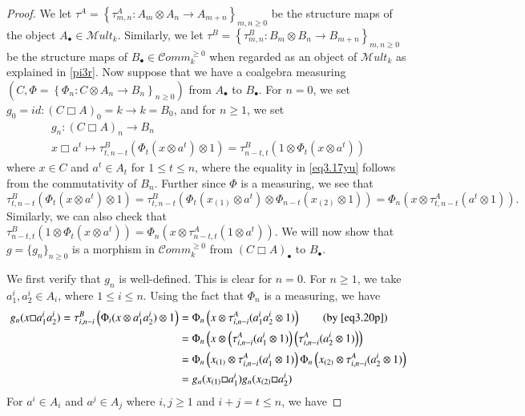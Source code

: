 \documentclass[10pt, colorlinks]{article}
\numberwithin{equation}{section} \DeclareMathSizes{2}{10}{12}{13}
\begin{document}
    
    \begin{proof} 
   We let  $\tau^A=\left\{\tau^A_{m,n}: A_m\otimes A_n\longrightarrow A_{m+n}\right\}_{m,n\geq 0}$ be the structure maps of 
the object $A_\bullet\in  \mathscr Mult_k$. Similarly, we   let $\tau^B=\left\{\tau^B_{m,n}: B_m\otimes B_n\longrightarrow B_{m+n}\right\}_{m,n\geq 0}$ be the structure maps of  $B_\bullet\in  \mathcal Comm_k^{\geq 0}$ when regarded as an object of $\mathscr Mult_k$ as explained in \eqref{pi3r}. Now suppose that we have a coalgebra measuring $\left(C,\Phi=\left\{\Phi_n:C\otimes A_n\longrightarrow B_n\right\}_{n\geq 0}\right)$ from $A_\bullet$ to $B_\bullet$.
    For $n=0$, we set $g_0=id:(C\Box A)_0=k\longrightarrow k=B_0$, and for $n\geq 1$, we set
    \begin{equation}\label{eq3.17yu}
        \begin{array}{c}
             g_n:(C\Box A)_n\longrightarrow B_n \\
              x\Box a^t\longmapsto \tau^B_{t,n-t}(\Phi_t(x\otimes a^t)\otimes 1)=\tau^B_{n-t,t}(1\otimes \Phi_t(x\otimes a^t))
        \end{array}
    \end{equation}
    where $x\in C$ and $a^t\in A_t$ for $1\leq t\leq n$, where  the equality in \eqref{eq3.17yu} follows from the commutativity of $B_n$. Further since $\Phi$ is a measuring, we see that
    \begin{equation}\label{eq3.20p}
          \tau^B_{t,n-t}(\Phi_t(x\otimes a^t)\otimes1)=\tau^B_{t,n-t}(\Phi_{t}(x_{(1)}\otimes a^t)\otimes \Phi_{n-t}(x_{(2)}\otimes 1))=\Phi_n(x\otimes\tau^A_{t,n-t}( a^t\otimes 1)) .
    \end{equation}
    Similarly, we can also check that $ \tau^B_{n-t,t}(1\otimes \Phi_t(x\otimes a^t))=\Phi_n(x\otimes\tau^A_{n-t,t}(1\otimes a^t))$. We will now show that $g=\{g_n\}_{n\geq 0}$ is a morphism in $\mathcal Comm_k^{\geq 0}$ from $(C\Box A)_\bullet$ to $B_\bullet$. 

\smallskip 
We first verify that $g_n$ is well-defined. This is clear for $n=0$. For $n\geq 1$, we take $a_1^i,a_2^i\in A_i$, where $1\leq i\leq n$. Using the fact that $\Phi_n$ is a measuring, we have 
            \begin{align*}
             g_n(x\Box a_1^ia_2^i)=\tau^B_{i,n-i}\left(\Phi_i(x\otimes a_1^ia_2^i)\otimes 1\right)
            &=\Phi_n\left(x\otimes \tau^A_{i,n-i}( a_1^ia_2^i\otimes 1)\right)\tag{by \eqref{eq3.20p}}\\
           & =\Phi_n\left(x\otimes \left(\tau^A_{i,n-i}( a_1^i\otimes 1)\right)\left(\tau^A_{i,n-i}( a_2^i\otimes 1)\right)\right)\\
            &=\Phi_n\left(x_{(1)}\otimes \tau^A_{i,n-i}( a_1^i\otimes 1)\right)\Phi_n\left(x_{(2)}\otimes \tau^A_{i,n-i}( a_2^i\otimes 1)\right)\\
            &=g_n(x_{(1)}\Box a^i_1)g_n(x_{(2)}\Box a^i_2)
            \end{align*}
        For  $a^i\in A_i$ and $a^j\in A_j$ where $ i,j\geq 1 $ and $i+j=t \leq n$, we have


\end{proof}
\end{document}

